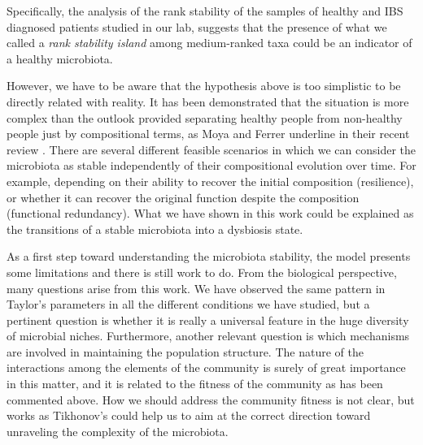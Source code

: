 Specifically, the analysis of the rank stability of the samples of healthy and IBS diagnosed patients studied in our lab\cite{IBS}, suggests that the presence of what we called a \emph{rank stability island} among medium-ranked taxa could be an indicator of a healthy microbiota. 

However, we have to be aware that the hypothesis above is too simplistic to be directly related with reality. It has been demonstrated that the situation is more complex than the outlook provided separating healthy people from non-healthy people just by compositional terms, as Moya and Ferrer underline in their recent review \cite{Moya_trends}. There are several different feasible scenarios in which we can consider the microbiota as stable independently of their compositional evolution over time. For example, depending on their ability to recover the initial composition (resilience), or whether it can recover the original function despite the composition (functional redundancy). What we have shown in this work could be explained as the transitions of a stable microbiota into a dysbiosis state.  

As a first step toward understanding the microbiota stability, the model presents some limitations and there is still work to do. From the biological perspective, many questions arise from this work. We have observed the same pattern in Taylor's parameters in all the different conditions we have studied, but a pertinent question is whether it is really a universal feature in the huge diversity of microbial niches. Furthermore, another relevant question is which mechanisms are involved in maintaining the population structure. The nature of the interactions among the elements of the community is surely of great importance in this matter, and it is related to the fitness of the community as has been commented above. How we should address the community fitness is not clear, but works as Tikhonov's \cite{tikhonov} could help us to aim at the correct direction toward unraveling the complexity of the microbiota.